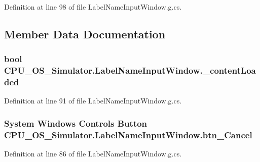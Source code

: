 Definition at line 98 of file Label\+Name\+Input\+Window.\+g.\+cs.



\subsection{Member Data Documentation}
\hypertarget{class_c_p_u___o_s___simulator_1_1_label_name_input_window_a5def66d276be8f829884f7b6be1d107e}{}
\subsubsection[{\+\_\+content\+Loaded}]{\setlength{\rightskip}{0pt plus 5cm}bool C\+P\+U\+\_\+\+O\+S\+\_\+\+Simulator.\+Label\+Name\+Input\+Window.\+\_\+content\+Loaded\hspace{0.3cm}{\ttfamily [private]}}\label{class_c_p_u___o_s___simulator_1_1_label_name_input_window_a5def66d276be8f829884f7b6be1d107e}


Definition at line 91 of file Label\+Name\+Input\+Window.\+g.\+cs.

\hypertarget{class_c_p_u___o_s___simulator_1_1_label_name_input_window_a409c16e5105450841ff7dd21628a98b9}{}
\subsubsection[{btn\+\_\+\+Cancel}]{\setlength{\rightskip}{0pt plus 5cm}System Windows Controls Button C\+P\+U\+\_\+\+O\+S\+\_\+\+Simulator.\+Label\+Name\+Input\+Window.\+btn\+\_\+\+Cancel\hspace{0.3cm}{\ttfamily [package]}}\label{class_c_p_u___o_s___simulator_1_1_label_name_input_window_a409c16e5105450841ff7dd21628a98b9}


Definition at line 86 of file Label\+Name\+Input\+Window.\+g.\+cs.

